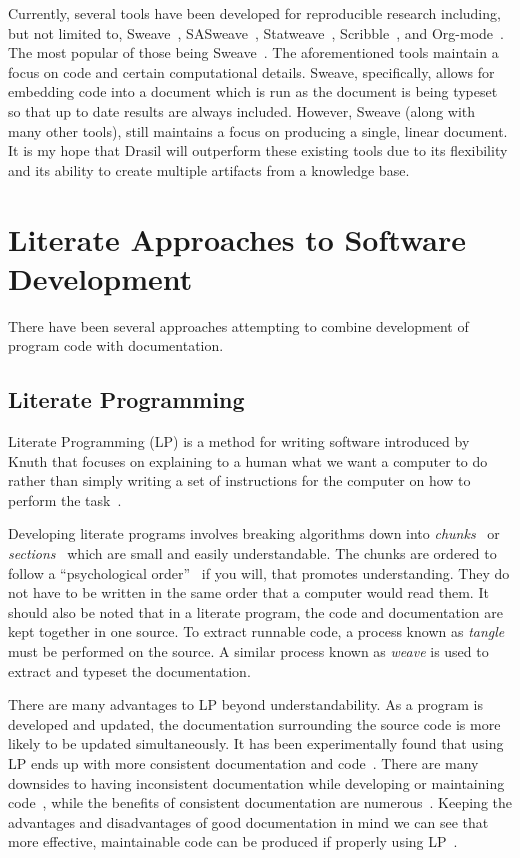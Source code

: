 Currently, several tools have been developed for reproducible research
including, but not limited to, Sweave~\cite{Leisch2002},
SASweave~\cite{LenthEtAl2007}, Statweave~\cite{Lenth2009},
Scribble~\cite{FlattEtAl2009}, and Org-mode~\cite{SchulteEtAl2012}. The most
popular of those being Sweave~\cite{SchulteEtAl2012}. The aforementioned tools
maintain a focus on code and certain computational details. Sweave,
specifically, allows for embedding code into a document which is run as the
document is being typeset so that up to date results are always included.
However, Sweave (along with many other tools), still maintains a focus on
producing a single, linear document. It is my hope that Drasil will outperform
these existing tools due to its flexibility and its ability to create multiple
artifacts from a knowledge base.

\section{Literate Approaches to Software Development}

There have been several approaches attempting to combine development of program 
code with documentation.

\subsection{Literate Programming}

Literate Programming (LP) is a method for writing software introduced by Knuth 
that focuses on explaining to a human what we want a computer to do rather than 
simply writing a set of instructions for the computer on how to perform the 
task~\cite{Knuth1984}.

Developing literate programs involves breaking algorithms down into
\emph{chunks}~\cite{JohnsonAndJohnson1997} or \emph{sections}~\cite{Knuth1984}
which are small and easily understandable. The chunks are ordered to follow a 
``psychological order''~\cite{PieterseKourieAndBoake2004} if
you will, that promotes understanding. They do not have to be written in the 
same order that a computer would read them. It should also be noted that in a 
literate program, the code and documentation are kept together in one source. 
To extract runnable code, a process known as \emph{tangle} must be performed on 
the source. A similar process known as \emph{weave} is used to extract and 
typeset the documentation.

There are many advantages to LP beyond understandability. As a program is
developed and updated, the documentation surrounding the source code is more 
likely to be updated simultaneously. It has been experimentally found that 
using LP ends up with more consistent documentation and 
code~\cite{ShumAndCook1993}. There are many downsides to having inconsistent 
documentation while developing or maintaining 
code~\cite{Kotula2000,Thimbleby1986}, while the benefits of consistent 
documentation are numerous~\cite{Hyman1990, Kotula2000}. Keeping the advantages 
and disadvantages of good documentation in mind we can see that more effective, 
maintainable code can be produced if properly using 
LP~\cite{PieterseKourieAndBoake2004}.

